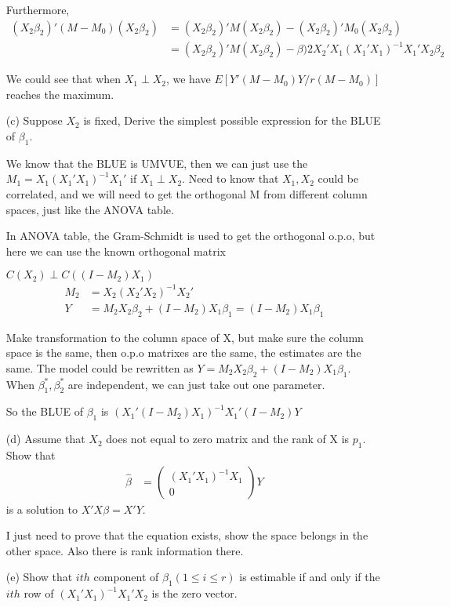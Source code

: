 \begin{itemize}
Furthermore, 
\begin{align*}
(X_2 \beta_2)' (M-M_0) (X_2 \beta_2) &= (X_2 \beta_2)' M (X_2 \beta_2)  - (X_2 \beta_2)' M_0 (X_2 \beta_2) \\
&=  (X_2 \beta_2)' M (X_2 \beta_2)  - \beta)2 X_2' X_1 (X_1' X_1)^{-1} X_1' X_2 \beta_2 
\end{align*}

We could see that when $X_1 \perp X_2$, we have $E [ Y' (M-M_0) Y \Big / r(M- M_0) ] $ reaches the maximum. 

\item[(c)] Suppose $X_2$ is fixed, Derive the simplest possible expression for the BLUE of $\beta_1$.

We know that the BLUE is UMVUE, then we can just use the $M_1 = X_1(X_1'X_1)^{-1} X_1'$ if $X_1 \perp X_2$.
Need to know that $X_1, X_2$ could be correlated, and we will need to get the orthogonal M from different column spaces, just like the ANOVA table.

In ANOVA table, the Gram-Schmidt is used to get the orthogonal o.p.o, but here we can use the known orthogonal matrix

$C(X_2) \perp C((I- M_2) X_1)$
\begin{align*}
M_2 &= X_2 (X_2' X_2)^{-1} X_2' \\
Y &= M_2 X_2 \beta_2 + (I-M_2) X_1 \beta_1 = (I-M_2) X_1 \beta_1
\end{align*}

Make transformation to the column space of X, but make sure the column space is the same, then o.p.o matrixes are the same, the estimates are the same.
The model could be rewritten as $Y = M_2 X_2 \beta_2 + (I-M_2) X_1 \beta_1 $. When $\beta_1^{\ast}, \beta_2^{\ast}$ are independent, we can just take out one parameter.

So the BLUE of $\beta_1$ is $(X_1' (I-M_2) X_1)^{-1} X_1' (I-M_2) Y$

\item[(d)] Assume that $X_2$ does not equal to zero matrix and the rank of X is $p_1$. Show that 
\begin{align*}
\hat{\beta} &= \begin{pmatrix}
(X_1' X_1)^{-1} X_1 \\
0
\end{pmatrix} Y
\end{align*}
is a solution to $X'X \beta = X' Y$.

I just need to prove that the equation exists, show the space belongs in the other space. Also there is rank information there.

\item[(e)] Show that $ith$ component of $\beta_1 (1 \leq i \leq r)$ is estimable if and only if the $ith$ row of $(X_1' X_1)^{-1}X_1' X_2$ is the zero vector.




\end{itemize}



 